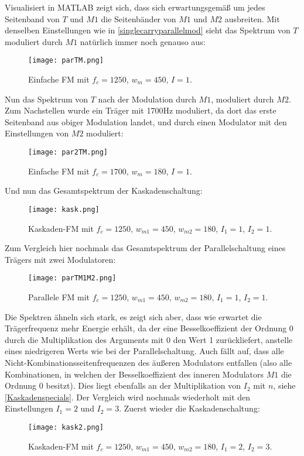 Visualisiert in MATLAB zeigt sich, dass sich erwartungsgemäß um jedes Seitenband von $T$ und $M1$ die Seitenbänder von $M1$ und $M2$ ausbreiten. Mit denselben Einstellungen wie in \ref{singlecarryparallelmod} sieht das Spektrum von $T$ moduliert durch $M1$ natürlich immer noch genauso aus:
\FloatBarrier
\begin{figure} [ht]
\centering
  \texttt{[image: parTM.png]}
\caption{Einfache FM mit $f_c = 1250$, $w_m = 450$, $I = 1$. }
\end{figure}
\FloatBarrier
Nun das Spektrum von $T$ nach der Modulation durch $M1$, moduliert durch $M2$. Zum Nachstellen wurde ein Träger mit 1700Hz moduliert, da dort das erste Seitenband aus obiger Modulation landet, und durch einen Modulator mit den Einstellungen von $M2$ moduliert:
\FloatBarrier
\begin{figure} [ht]
\centering
  \texttt{[image: par2TM.png]}
\caption{Einfache FM mit $f_c = 1700$, $w_m = 180$, $I = 1$. }
\end{figure}
\FloatBarrier
Und nun das Gesamtspektrum der Kaskadenschaltung:
\FloatBarrier
\begin{figure} [ht]
\centering
  \texttt{[image: kask.png]}
\caption{Kaskaden-FM mit $f_c = 1250$, $w_{m1} = 450$, $w_{m2} = 180$, $I_1 = 1$, $I_2 = 1$. }
\end{figure}
\FloatBarrier
Zum Vergleich hier nochmals das Gesamtspektrum der Parallelschaltung eines Trägers mit zwei Modulatoren:
\FloatBarrier
\begin{figure} [ht]
\centering
  \texttt{[image: parTM1M2.png]}
\caption{Parallele FM mit $f_c = 1250$, $w_{m1} = 450$, $w_{m2} = 180$, $I_1 = 1$, $I_2 = 1$. }
\end{figure}
\FloatBarrier
Die Spektren ähneln sich stark, es zeigt sich aber, dass wie erwartet die Trägerfrequenz mehr Energie erhält, da der eine Besselkoeffizient der Ordnung $0$ durch die Multiplikation des Arguments mit $0$ den Wert 1 zurückliefert, anstelle eines niedrigeren Werts wie bei der Parallelschaltung. Auch fällt auf, dass alle Nicht-Kombinationsseitenfrequenzen des äußeren Modulators entfallen (also alle Kombinationen, in welchen der Besselkoeffizient des inneren Modulators $M1$ die Ordnung $0$ besitzt). Dies liegt ebenfalls an der Multiplikation von $I_2$ mit $n$, siehe \ref{Kaskadenspecials}. 
Der Vergleich wird nochmals wiederholt mit den Einstellungen $I_1 = 2$ und $I_2 = 3$. Zuerst wieder die Kaskadenschaltung:
\FloatBarrier
\begin{figure} [ht]
\centering
  \texttt{[image: kask2.png]}
\caption{Kaskaden-FM mit $f_c = 1250$, $w_{m1} = 450$, $w_{m2} = 180$, $I_1 = 2$, $I_2 = 3$. }
\end{figure}

